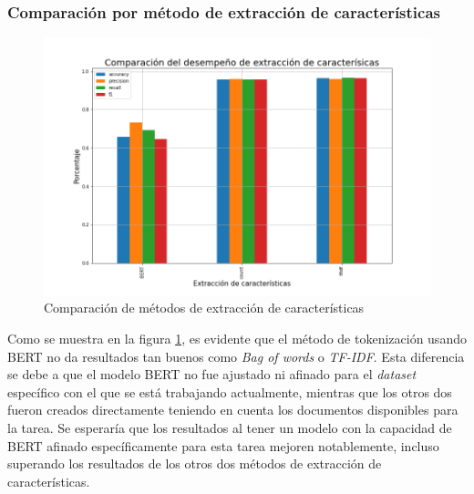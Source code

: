 \subsubsection{Comparación por método de extracción de características}
\begin{figure}
    \centering
    \includegraphics[width=\textwidth]{results/FakeNewsDetection/feature_extraction_comparison.png}
    \caption{Comparación de métodos de extracción de características}
    \label{fig:fake_news_feature_extraction}
\end{figure}

Como se muestra en la figura \ref{fig:fake_news_feature_extraction}, es evidente que el método de tokenización usando BERT no da resultados tan buenos como \textit{Bag of words} o \textit{TF-IDF}. Esta diferencia se debe a que el modelo BERT no fue ajustado ni afinado para el \textit{dataset} específico con el que se está trabajando actualmente, mientras que los otros dos fueron creados directamente teniendo en cuenta los documentos disponibles para la tarea. Se esperaría que los resultados al tener un modelo con la capacidad de BERT afinado específicamente para esta tarea mejoren notablemente, incluso superando los resultados de los otros dos métodos de extracción de características.

